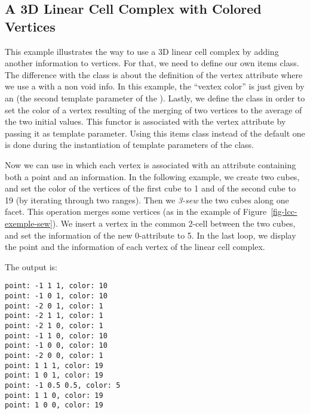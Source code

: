 \subsection{A 3D Linear Cell Complex with Colored Vertices}
\label{ssec-exemple-color-vertices}

This example illustrates the way to use a 3D linear cell complex by
adding another information to vertices. For that, we need to define
our own items class.  The difference with the
 class is about the definition of
the vertex attribute where we use a 
with a non void info. In this example, the ``vextex color'' is just
given by an  (the second template parameter of the
).  Lastly, we define the
 class in order to set the color of a vertex
resulting of the merging of two vertices to the average of the two
initial values. This functor is associated with the vertex attribute
by passing it as template parameter.  Using this items class instead of
the default one is done during the instantiation of template
parameters of the  class.

Now we can use  in which each vertex is associated with an
attribute containing both a point and an information. In the following
example, we create two cubes, and set the color of the vertices of the
first cube to 1 and of the second cube to 19 (by iterating through two
 ranges).  Then we
\emph{3-sew} the two cubes along one facet. This operation merges some
vertices (as in the example of Figure~\ref{fig-lcc-exemple-sew}).  We
insert a vertex in the common 2-cell between the two cubes, and set
the information of the new 0-attribute to 5.  In the last loop, we
display the point and the information of each vertex of the linear
cell complex.


The output is:
\begin{verbatim}
point: -1 1 1, color: 10
point: -1 0 1, color: 10
point: -2 0 1, color: 1
point: -2 1 1, color: 1
point: -2 1 0, color: 1
point: -1 1 0, color: 10
point: -1 0 0, color: 10
point: -2 0 0, color: 1
point: 1 1 1, color: 19
point: 1 0 1, color: 19
point: -1 0.5 0.5, color: 5
point: 1 1 0, color: 19
point: 1 0 0, color: 19
\end{verbatim}

